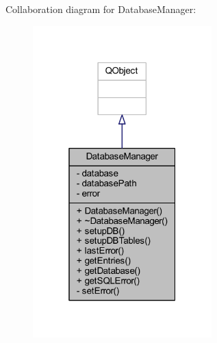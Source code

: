 Collaboration diagram for Database\+Manager\+:
\nopagebreak
\begin{figure}[H]
\begin{center}
\leavevmode
\includegraphics[width=196pt]{class_database_manager__coll__graph}
\end{center}
\end{figure}
